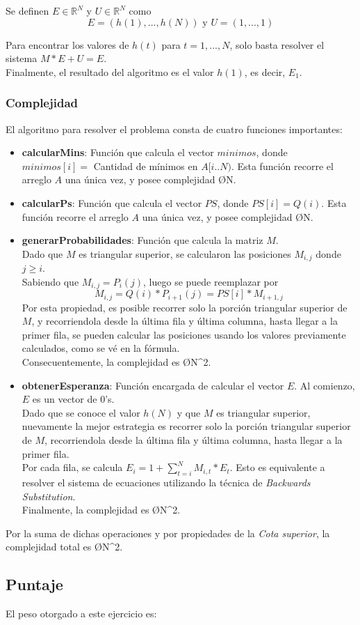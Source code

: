 \noindent Se definen $E \in \mathbb{R}^N$ y $U \in \mathbb{R}^N$ como 
\[ E = (h(1),...,h(N))\text{ y }U = (1,...,1) \]

\noindent Para encontrar los valores de $h(t)$ para $t = 1,...,N$, solo basta resolver el sistema $M*E + U = E$.\\

\noindent Finalmente, el resultado del algoritmo es el valor $h(1)$, es decir, $E_1$.

\subsubsection{Complejidad}
El algoritmo para resolver el problema consta de cuatro funciones importantes:
\begin{itemize}
	\item \textbf{calcularMins}: Función que calcula el vector $minimos$, donde $minimos[i] = $ Cantidad de mínimos en $A[i..N)$. Esta función recorre el arreglo $A$ una única vez, y posee complejidad \O{N}.
	\item \textbf{calcularPs}: Función que calcula el vector $PS$, donde $PS[i] = Q(i)$. Esta función recorre el arreglo $A$ una única vez, y posee complejidad \O{N}.
	\item \textbf{generarProbabilidades}: Función que calcula la matriz $M$. \\
	Dado que $M$ es triangular superior, se calcularon las posiciones $M_{i,j}$ donde $j \geq i$. \\
	Sabiendo que $M_{i,j} = P_i(j)$, luego se puede reemplazar por \[ M_{i,j} = Q(i) * P_{i+1}(j) = PS[i] * M_{i+1,j} \]
	Por esta propiedad, es posible recorrer solo la porción triangular superior de $M$, y recorriendola desde la última fila y última columna, hasta llegar a la primer fila, se pueden calcular las posiciones usando los valores previamente calculados, como se vé en la fórmula.\\
	Consecuentemente, la complejidad es \O{N^2}.
	\item \textbf{obtenerEsperanza}: Función encargada de calcular el vector $E$. Al comienzo, $E$ es un vector de $0$'s. \\
	Dado que se conoce el valor $h(N)$ y que $M$ es triangular superior, nuevamente la mejor estrategia es recorrer solo la porción triangular superior de $M$, recorriendola desde la última fila y última columna, hasta llegar a la primer fila.\\
	Por cada fila, se calcula $\displaystyle E_i = 1 + \sum_{t = i}^{N} M_{i,t}*E_{t}$. Esto es equivalente a resolver el sistema de ecuaciones utilizando la técnica de \emph{Backwards Substitution}\textsuperscript{\cite{backsust}}.\\
	Finalmente, la complejidad es \O{N^2}.
\end{itemize}

\noindent Por la suma de dichas operaciones y por propiedades de la \emph{Cota superior}, la complejidad total es \O{N^2}.

\subsection{Puntaje}
El peso otorgado a este ejercicio es:
